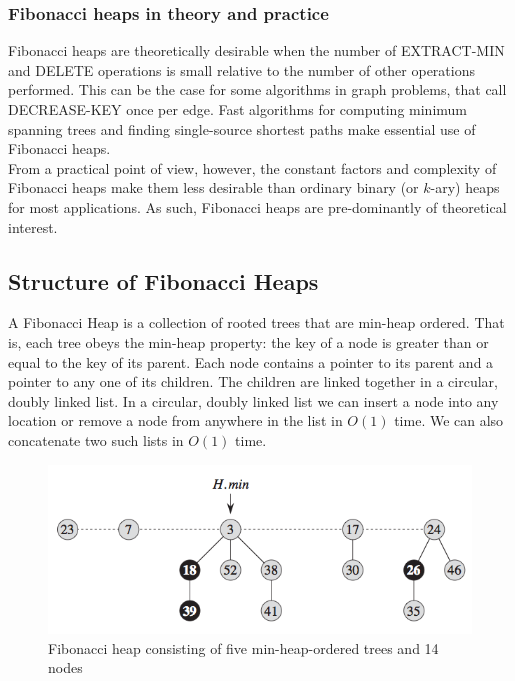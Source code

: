 \documentclass[12pt]{article}
\begin{document}
\subsubsection{Fibonacci heaps in theory and practice}
Fibonacci heaps are theoretically desirable when the number of EXTRACT-MIN and DELETE operations is small relative to the number of other operations performed. This can be the case for some algorithms in graph problems, that call DECREASE-KEY once per edge. Fast algorithms for computing minimum spanning trees and finding single-source shortest paths make essential use of Fibonacci heaps.\\

From a practical point of view, however, the constant factors and complexity of Fibonacci heaps make them less desirable than ordinary binary (or $k$-ary) heaps for most applications. As such, Fibonacci heaps are pre-dominantly of theoretical interest.
%
\subsection{Structure of Fibonacci Heaps}
A Fibonacci Heap is a collection of rooted trees that are min-heap ordered. That is, each tree obeys the min-heap property: the key of a node is greater than or equal to the key of its parent. Each node contains a pointer to its parent and a pointer to any one of its children. The children are linked together in a circular, doubly linked list. In a circular, doubly linked list we can insert a node into any location or remove a node from anywhere in the list in $O(1)$ time. We can also concatenate two such lists in $O(1)$ time.
\begin{figure} [H]
    \begin{center}
        \includegraphics[width=\textwidth]{Images/Hmin.png}
        \caption{Fibonacci heap consisting of five min-heap-ordered trees and 14 nodes}
        \label{fig:H.min}
    \end{center}
\end{figure}
\end{document}
